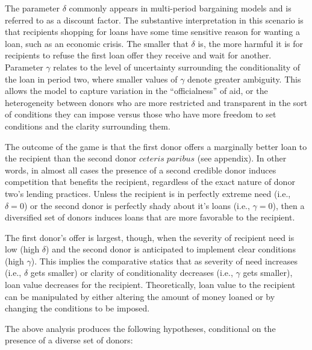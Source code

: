 \documentclass{article}
\begin{document}
The parameter $\delta$ commonly appears in multi-period bargaining models and is referred to as a discount factor. The substantive interpretation in this scenario is that recipients shopping for loans have some time sensitive reason for wanting a loan, such as an economic crisis. The smaller that $\delta$ is, the more harmful it is for recipients to refuse the first loan offer they receive and wait for another. Parameter $\gamma$ relates to the level of uncertainty surrounding the conditionality of the loan in period two, where smaller values of $\gamma$ denote greater ambiguity. This allows the model to capture variation in the ``officialness'' of aid, or the heterogeneity between donors who are more restricted and transparent in the sort of conditions they can impose versus those who have more freedom to set conditions and the clarity surrounding them.

The outcome of the game is that the first donor offers a marginally better loan to the recipient than the second donor $ceteris\;paribus$ (see appendix). In other words, in almost all cases the presence of a second credible donor induces competition that benefits the recipient, regardless of the exact nature of donor two's lending practices. Unless the recipient is in perfectly extreme need (i.e., $\delta=0$) or the second donor is perfectly shady about it's loans (i.e., $\gamma=0$), then a diversified set of donors induces loans that are more favorable to the recipient.

The first donor's offer is largest, though, when the severity of recipient need is low (high $\delta$) and the second donor is anticipated to implement clear conditions (high $\gamma$). This implies the comparative statics that as severity of need increases (i.e., $\delta$ gets smaller) or clarity of conditionality decreases (i.e., $\gamma$ gets smaller), loan value decreases for the recipient. Theoretically, loan value to the recipient can be manipulated by either altering the amount of money loaned or by changing the conditions to be imposed.

The above analysis produces the following hypotheses, conditional on the presence of a diverse set of donors:
\end{document}
